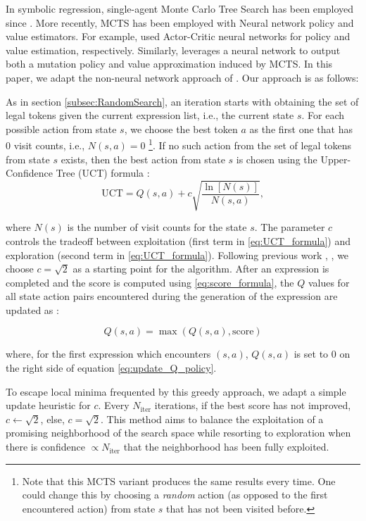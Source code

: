 \documentclass[runningheads]{llncs}
\begin{document}
In symbolic regression, single-agent Monte Carlo Tree Search has been employed since \cite{CazenaveMCTS}. More recently, MCTS has been employed with Neural network policy and value estimators. For example, \cite{Lu2021} used Actor-Critic neural networks for policy and value estimation, respectively. Similarly,  \cite{10.5555/3618408.3619047} leverages a neural network to output both a mutation policy and value approximation induced by MCTS. In this paper, we adapt the non-neural network approach of \cite{sun2023symbolic}.  Our approach is as follows:
\par As in section \ref{subsec:RandomSearch}, an iteration starts with obtaining the set of legal tokens given the current expression list, i.e., the current state $s$. For each possible action from state $s$, we choose the best token $a$ as the first one that has 0 visit counts, i.e., $N(s,a) = 0$ \footnote{Note that this MCTS variant produces the same results every time. One could change this by choosing a \emph{random} action (as opposed to the first encountered action) from state $s$ that has not been visited before. }. If no such action from the set of legal tokens from state $s$ exists, then the best action from state $s$ is chosen using the Upper-Confidence Tree (UCT) formula \cite{sun2023symbolic}:
\begin{equation}
\mathrm{UCT} = Q(s,a) + c\sqrt{\frac{\ln{[N(s)]}}{N(s,a)}}, \label{eq:UCT_formula}
\end{equation}

where $N(s)$ is the number of visit counts for the state $s$. The parameter $c$ controls the tradeoff between exploitation (first term in \ref{eq:UCT_formula}) and exploration (second term in \ref{eq:UCT_formula}). Following previous work \cite{Swiechowski2023} \cite{Auer2002}, \cite{kuleshov2014algorithms} \cite{10.1007/11871842_29}, we choose $c = \sqrt{2}$ as a starting point for the algorithm. After an expression is completed and the score is computed using \ref{eq:score_formula}, the $Q$ values for all state action pairs encountered during the generation of the expression are updated as \cite{sun2023symbolic}:

\begin{equation}
Q(s,a) = \max{\left(Q(s,a), \mathrm{score}\right)} \label{eq:update_Q_policy}
\end{equation}

where, for the first expression which encounters $(s,a)$, $Q(s,a)$ is set to 0 on the right side of equation \ref{eq:update_Q_policy}. 
\par To escape local minima frequented by this greedy approach, we adapt a simple update heuristic for $c$.  Every $N_{\mathrm{iter}}$ iterations, if the best score has not improved, $c \gets \sqrt{2}$, else, $c = \sqrt{2}$. This method aims to balance the exploitation of a promising neighborhood of the search space while resorting to exploration when there is confidence $\propto N_{\mathrm{iter}}$ that the neighborhood has been fully exploited.
\end{document}
